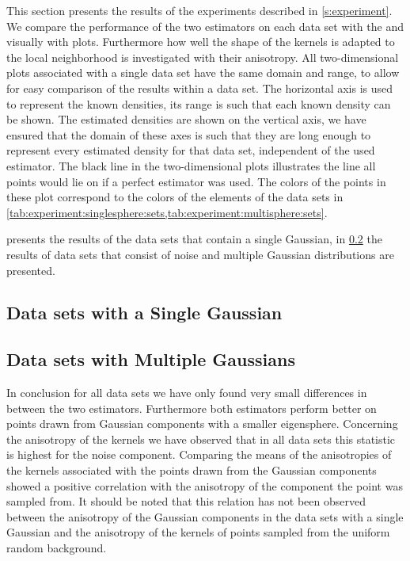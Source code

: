 
This section presents the results of the experiments described in \cref{s:experiment}. 
We compare the performance of the two estimators on each data set with the \mse and visually with plots. Furthermore how well the shape of the kernels is adapted to the local neighborhood is investigated with their anisotropy.
	All two-dimensional plots associated with a single data set have the same domain and range, to allow for easy comparison of the results within a data set. The horizontal axis is used to represent the known densities, its range is such that each known density can be shown. The estimated densities are shown on the vertical axis, we have ensured that the domain of these axes is such that they are long enough to represent every estimated density for that data set, independent of the used estimator. 
	The black line in the two-dimensional plots illustrates the line all points would lie on if a perfect estimator was used.
	The colors of the points in these plot correspond to the colors of the elements of the data sets in \cref{tab:experiment:singlesphere:sets,tab:experiment:multisphere:sets}.

	 presents the results of the data sets that contain a single Gaussian, in \cref{s:results:multipleGaussian} the results of data sets that consist of noise and multiple Gaussian distributions are presented. 

\subsection{Data sets with a Single Gaussian}
\label{s:results:singleGaussian}


\subsection{Data sets with Multiple Gaussians}
\label{s:results:multipleGaussian}


	In conclusion for all data sets we have only found very small differences in \mse between the two estimators. 
	Furthermore both estimators perform better on points drawn from Gaussian components with a smaller eigensphere. 
	Concerning the anisotropy of the kernels we have observed that in all data sets this statistic is highest for the noise component. 
	Comparing the means of the anisotropies of the kernels associated with the points drawn from the Gaussian components showed a positive correlation with the anisotropy of the component the point was sampled from. It should be noted that this relation has not been observed between the anisotropy of the Gaussian components in the data sets with a single Gaussian and the anisotropy of the kernels of points sampled from the uniform random background.